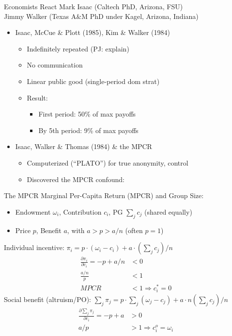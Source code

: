 \begin{frame}{Economists React}
Mark Isaac (Caltech PhD, Arizona, FSU)\\
Jimmy Walker (Texas A\&M PhD under Kagel, Arizona, Indiana)
\begin{itemize}
    \item Isaac, McCue \& Plott (1985), Kim \& Walker (1984)
    \begin{itemize}
        \item Indefinitely repeated (PJ: explain)
        \item No communication
        \item Linear public good (single-period dom strat)
        \item Result:
        \begin{itemize}
            \item First period: 50\% of max payoffs
            \item By 5th period: 9\% of max payoffs
        \end{itemize}
    \end{itemize}
    \item Isaac, Walker \& Thomas (1984) \& the MPCR
    \begin{itemize}
        \item Computerized (``PLATO'') for true anonymity, control
        \item Discovered the MPCR confound:
    \end{itemize}
\end{itemize}
\end{frame}

\begin{frame}{The MPCR}
Marginal Per-Capita Return (MPCR) and Group Size:
\begin{itemize}
    \item Endowment $\omega_i$, Contribution $c_i$, PG $\sum_j c_j$ (shared equally)
    \item  Price $p$, Benefit $a$, with $a > p > a/n$ (often $p=1$)
\end{itemize}
Individual incentive: $\pi_i= p\cdot (\omega_i-c_i) + a \cdot (\sum_j c_j)/n$
    \begin{align*}
      \frac{\partial \pi_i}{\partial c_i} = -p + a/n &< 0 \\
                                        \frac{a/n}{p} &< 1 \\
                                        MPCR &< 1 \Rightarrow c_i^*=0
    \end{align*}
Social benefit (altruism/PO): $\sum_j \pi_j = p\cdot \sum_j(\omega_j-c_j) + a \cdot n(\sum_j c_j)/n$
\begin{align*}
      \frac{\partial \sum_j \pi_j}{\partial c_i} = -p + a &> 0 \\
                                        a/p &> 1 \Rightarrow c_i^o = \omega_i
    \end{align*}
\end{frame}

